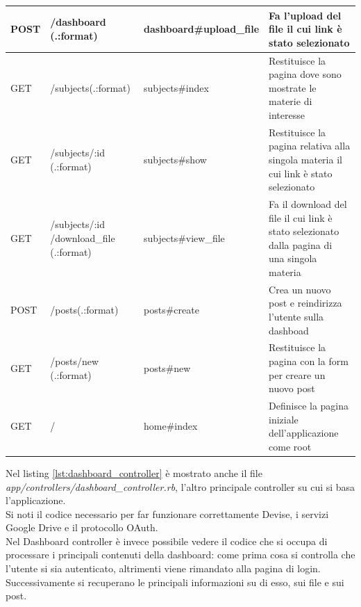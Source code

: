 \documentclass[Lau, binding=0.6cm, oneside]{sapthesis}
\begin{document}
\begin{center}
\begin{longtable}[H]{p{}p{}p{}p{}}
		\midrule
		\rowcolor[gray]{0.9}
		POST & /dashboard (.:format) & dashboard\#upload\_file & Fa l'upload del file il cui link è stato selezionato\\
		\midrule
		GET & /subjects(.:format) & subjects\#index & Restituisce la pagina dove sono mostrate le materie di interesse \\
		\midrule 
		GET & /subjects/:id (.:format) & subjects\#show & Restituisce la pagina relativa alla singola materia il cui link è stato selezionato \\
		\midrule
		\rowcolor[gray]{0.9}
		GET & /subjects/:id /download\_file (.:format) & subjects\#view\_file & Fa il download del file il cui link è stato selezionato dalla pagina di una singola materia \\
		\midrule 
		POST & /posts(.:format) & posts\#create & Crea un nuovo post e reindirizza l'utente sulla dashboad\\
		\midrule 
		GET & /posts/new (.:format) & posts\#new & Restituisce la pagina con la form per creare un nuovo post\\
		\midrule
		\rowcolor[gray]{0.9}
		GET & / & home\#index & Definisce la pagina iniziale dell'applicazione come root \\
		\bottomrule
	\end{longtable}
\end{center}

Nel listing \ref{lst:dashboard_controller} è mostrato anche il file \textit{app/controllers/dashboard\_controller.rb}, l'altro principale controller su cui si basa l'applicazione.\\ 



Si noti il codice necessario per far funzionare correttamente Devise, i servizi Google Drive e il protocollo OAuth.\\



Nel Dashboard controller è invece possibile vedere il codice che si occupa di processare i principali contenuti della dashboard: come prima cosa si controlla che l'utente si sia autenticato, altrimenti viene rimandato alla pagina di login. Successivamente si recuperano le principali informazioni su di esso, sui file e sui post.
\end{document}

